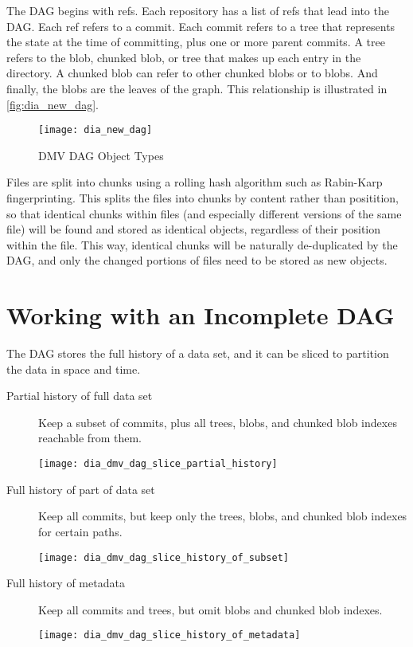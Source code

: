 The DAG begins with refs. Each repository has a list of refs that lead into the
DAG. Each ref refers to a commit. Each commit refers to a tree that represents
the state at the time of committing, plus one or more parent commits. A tree
refers to the blob, chunked blob, or tree that makes up each entry in the
directory. A chunked blob can refer to other chunked blobs or to blobs. And
finally, the blobs are the leaves of the graph. This relationship is illustrated
in \autoref{fig:dia_new_dag}.

\begin{figure}[]
    \centering
        \texttt{[image: dia\_new\_dag]}
    \caption{DMV DAG Object Types}
    \label{fig:dia_new_dag}
\end{figure}


Files are split into chunks using a rolling hash algorithm such as Rabin-Karp
fingerprinting\cite{rabin_karp_fingerprinting}. This splits the files into
chunks by content rather than positition, so that identical chunks within files
(and especially different versions of the same file) will be found and stored as
identical objects, regardless of their position within the file. This way,
identical chunks will be naturally de-duplicated by the DAG, and only the
changed portions of files need to be stored as new objects.

%


\section{Working with an Incomplete DAG}

The DAG stores the full history of a data set, and it can be sliced to partition
the data in space and time.

\newcommand{\slicediagramwidth}{0.7\textwidth}

\begin{description}

    \item[Partial history of full data set] Keep a subset of commits, plus all
        trees, blobs, and chunked blob indexes reachable from them.

        \texttt{[image: dia\_dmv\_dag\_slice\_partial\_history]}

    \item[Full history of part of data set] Keep all commits, but keep only the
        trees, blobs, and chunked blob indexes for certain paths.

        \texttt{[image: dia\_dmv\_dag\_slice\_history\_of\_subset]}

    \item[Full history of metadata] Keep all commits and trees, but
        omit blobs and chunked blob indexes.

        \texttt{[image: dia\_dmv\_dag\_slice\_history\_of\_metadata]}

\end{description}

